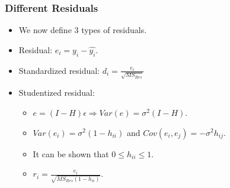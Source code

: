 \documentclass[10pt]{beamer} %
\begin{document}
\begin{frame}
   \frametitle{Different Residuals}
   \begin{itemize}
      \item We now define $3$ types of residuals.
         \vspace{0.5cm}
      \item Residual: $e_i=y_i-\hat{y_i}$.
         \vspace{0.5cm}
      \item Standardized residual: $d_i=\frac{e_i}{\sqrt{MS_{Res}}}$
         \vspace{0.5cm}
      \item Studentized residual:
         \begin{itemize}
            \item ${e}=(I-H)\epsilon \Rightarrow Var({e})=\sigma^2(I-H)$.
               \smallskip
            \item $Var(e_i)=\sigma^2(1-h_{ii})$ and $Cov(e_i,e_j)=-\sigma^2h_{ij}$.
               \smallskip
            \item It can be shown that $0 \leq h_{ii} \leq 1$.
               \smallskip
            \item $r_i=\frac{e_{i}}{\sqrt{MS_{Res}(1-h_{ii})}}$.
         \end{itemize}
   \end{itemize}    
\end{frame}
%
\end{document}
